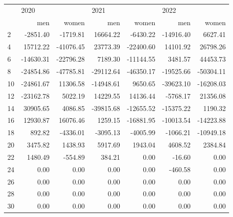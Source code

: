 \begin{tabular}{lrrrrrr}
\toprule
{} & \multicolumn{2}{l}{2020} & \multicolumn{2}{l}{2021} & \multicolumn{2}{l}{2022} \\
{} &       men &     women &       men &     women &       men &     women \\
\midrule
2  &  -2851.40 &  -1719.81 &  16664.22 &  -6430.22 & -14916.40 &   6627.41 \\
4  &  15712.22 & -41076.45 &  23773.39 & -22400.60 &  14101.92 &  26798.26 \\
6  & -14630.31 & -22796.28 &   7189.30 & -11144.55 &   3481.57 &  44453.73 \\
8  & -24854.86 & -47785.81 & -29112.64 & -46350.17 & -19525.66 & -50304.11 \\
10 & -24861.67 &  11306.58 & -14948.61 &   9650.65 & -39623.10 & -16208.03 \\
12 & -23162.78 &   5022.19 &  14229.55 &  14136.44 &  -5768.17 &  21356.08 \\
14 &  30905.65 &   4086.85 & -39815.68 & -12655.52 & -15375.22 &   1190.32 \\
16 &  12930.87 &  16076.46 &   1259.15 & -16881.95 & -10013.54 & -14223.88 \\
18 &    892.82 &  -4336.01 &  -3095.13 &  -4005.99 &  -1066.21 & -10949.18 \\
20 &   3475.82 &   1438.93 &   5917.69 &   1943.04 &   4608.52 &   2384.84 \\
22 &   1480.49 &   -554.89 &    384.21 &      0.00 &    -16.60 &      0.00 \\
24 &      0.00 &      0.00 &      0.00 &      0.00 &   -460.58 &      0.00 \\
26 &      0.00 &      0.00 &      0.00 &      0.00 &      0.00 &      0.00 \\
28 &      0.00 &      0.00 &      0.00 &      0.00 &      0.00 &      0.00 \\
30 &      0.00 &      0.00 &      0.00 &      0.00 &      0.00 &      0.00 \\
\bottomrule
\end{tabular}
